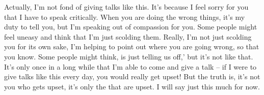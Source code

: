 Actually, I'm not fond of giving talks like this. It's because I feel sorry for you that I have to speak critically. When you are doing the wrong things, it's my duty to tell you, but I'm speaking out of compassion for you. Some people might feel uneasy and think that I'm just scolding them. Really, I'm not just scolding you for its own sake, I'm helping to point out where you are going wrong, so that you know. Some people might think,  is just telling us off,' but it's not like that. It's only once in a long while that I'm able to come and give a talk -- if I were to give talks like this every day, you would really get upset! But the truth is, it's not you who gets upset, it's only the  that are upset. I will say just this much for now. 
